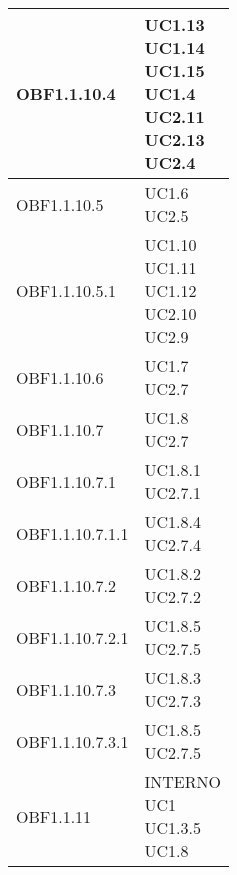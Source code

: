 \documentclass{scalatekids-article}
\begin{document}
\begin{longtable}[H]{|p{5.5cm}|p{5.5cm}|}
  \hline
  OBF1.1.10.4 & \multiLineCell[t]{UC1.13\\UC1.14\\UC1.15\\UC1.4\\UC2.11\\UC2.13\\UC2.4\\}\\
  \hline
  OBF1.1.10.5 & \multiLineCell[t]{UC1.6\\UC2.5\\}\\
  \hline
  OBF1.1.10.5.1 & \multiLineCell[t]{UC1.10\\UC1.11\\UC1.12\\UC2.10\\UC2.9\\}\\
  \hline
  OBF1.1.10.6 & \multiLineCell[t]{UC1.7\\UC2.7\\}\\
  \hline
  OBF1.1.10.7 & \multiLineCell[t]{UC1.8\\UC2.7\\}\\
  \hline
  OBF1.1.10.7.1 & \multiLineCell[t]{UC1.8.1\\UC2.7.1\\}\\
  \hline
  OBF1.1.10.7.1.1 & \multiLineCell[t]{UC1.8.4\\UC2.7.4\\}\\
  \hline
  OBF1.1.10.7.2 & \multiLineCell[t]{UC1.8.2\\UC2.7.2\\}\\
  \hline
  OBF1.1.10.7.2.1 & \multiLineCell[t]{UC1.8.5\\UC2.7.5\\}\\
  \hline
  OBF1.1.10.7.3 & \multiLineCell[t]{UC1.8.3\\UC2.7.3\\}\\
  \hline
  OBF1.1.10.7.3.1 & \multiLineCell[t]{UC1.8.5\\UC2.7.5\\}\\
  \hline
  OBF1.1.11 & \multiLineCell[t]{INTERNO\\UC1\\UC1.3.5\\UC1.8\\}\\

\end{longtable}
\end{document}
